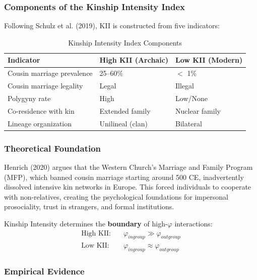 \subsubsection{Components of the Kinship Intensity Index}

Following Schulz et al. (2019), KII is constructed from five indicators:

\begin{table}[htbp]
\centering
\caption{Kinship Intensity Index Components}
\label{tab:kii-components}
\renewcommand{\arraystretch}{1.2}
\begin{tabular}{@{}p{4cm}p{4cm}p{4cm}@{}}
\toprule
\textbf{Indicator} & \textbf{High KII (Archaic)} & \textbf{Low KII (Modern)} \\
\midrule
Cousin marriage prevalence & 25--60\% & $<$ 1\% \\
Cousin marriage legality & Legal & Illegal \\
Polygyny rate & High & Low/None \\
Co-residence with kin & Extended family & Nuclear family \\
Lineage organization & Unilineal (clan) & Bilateral \\
\bottomrule
\end{tabular}
\end{table}

\subsubsection{Theoretical Foundation}

Henrich (2020) argues that the Western Church's Marriage and Family Program (MFP), which banned cousin marriage starting around 500 CE, inadvertently dissolved intensive kin networks in Europe. This forced individuals to cooperate with non-relatives, creating the psychological foundations for impersonal prosociality, trust in strangers, and formal institutions.

\begin{proposition}
\label{prop:kii-scope}
Kinship Intensity determines the \textbf{boundary} of high-$\varphi$ interactions:
\begin{align}
\text{High KII:} \quad &\varphi_{ingroup} \gg \varphi_{outgroup} \\
\text{Low KII:} \quad &\varphi_{ingroup} \approx \varphi_{outgroup}
\end{align}
\end{proposition}

\subsubsection{Empirical Evidence}

